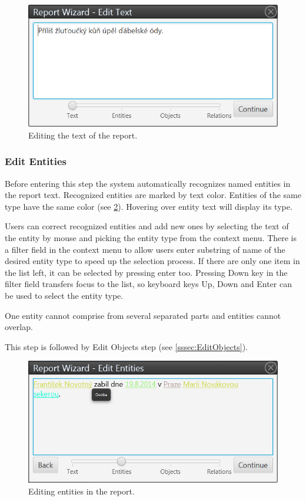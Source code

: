 \begin{figure}[!htb]
        \centering
        \includegraphics[width=\textwidth]{Images/reportedit}
        \caption{Editing the text of the report.}
        \label{fig:ReportEdit}
\end{figure}

\subsubsection{Edit Entities}
\label{sssec:EditEntities}

Before entering this step the system automatically recognizes named entities
in the report text. Recognized entities are marked by text color. Entities of
the same type have the same color (see \ref{fig:Entities}). Hovering over entity
text will display its type.

Users can correct recognized entities and add new ones by selecting the text
of the entity by mouse and picking the entity type from the context menu.
There is a filter field in the context menu to allow users enter substring of
name of the desired entity type to speed up the selection process. If there are
only one item in the list left, it can be selected by pressing enter too.
Pressing Down key in the filter field transfers focus to the list, so keyboard
keys Up, Down and Enter can be used to select the entity type.

One entity cannot comprise from several separated parts and entities cannot
overlap.

This step is followed by Edit Objects step (see \ref{sssec:EditObjects}).

\begin{figure}[!htb]
        \centering
        \includegraphics[width=\textwidth]{Images/entities}
        \caption{Editing entities in the report.}
        \label{fig:Entities}
\end{figure}

